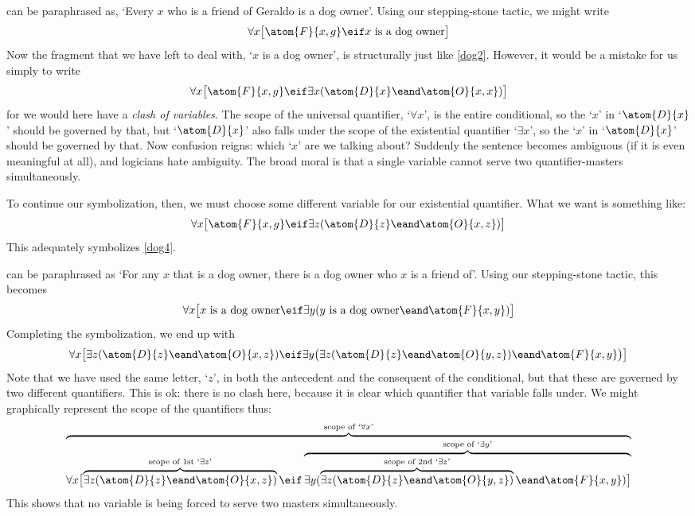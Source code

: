  can be paraphrased as, `Every $x$ who is a friend of Geraldo is a dog owner'. Using our stepping-stone tactic, we might write 
$$\forall x \bigl[\atom{F}{x,g} \eif x \text{ is a dog owner}\bigr]$$
Now the fragment that we have left to deal with, `$x$ is a dog owner', is structurally just like \cref*{dog2}. However, it would be a mistake for us simply to write 
$$\forall x \bigl[\atom{F}{x,g} \eif \exists x(\atom{D}{x} \eand \atom{O}{x,x})\bigr]$$
for we would here have a \emph{clash of variables}. The scope of the universal quantifier, `$\forall x$', is the entire conditional, so the `$x$' in `$\atom{D}{x}$' should be governed by that, but `$\atom{D}{x}$' also falls under the scope of the existential quantifier `$\exists x$', so the `$x$' in `$\atom{D}{x}$' should be governed by that. Now confusion reigns: which `$x$' are we talking about? Suddenly the sentence becomes ambiguous (if it is even meaningful at all), and logicians hate ambiguity. The broad moral is that a single variable cannot serve two quantifier-masters simultaneously.

To continue our symbolization, then, we must choose some different variable for our existential quantifier. What we want is something like:
$$\forall x\bigl[\atom{F}{x,g} \eif\exists z(\atom{D}{z} \eand \atom{O}{x,z})\bigr]$$
This adequately symbolizes \cref*{dog4}.

 can be paraphrased as `For any $x$ that is a dog owner, there is a dog owner who $x$ is a friend of'. Using our stepping-stone tactic, this becomes 
$$\forall x\bigl[\mbox{$x$ is a dog owner}\eif\exists y(\mbox{$y$ is a dog owner}\eand \atom{F}{x,y})\bigr]$$
Completing the symbolization, we end up with
$$\forall x\bigl[\exists z(\atom{D}{z} \eand \atom{O}{x,z})\eif\exists y\bigl(\exists z(\atom{D}{z} \eand \atom{O}{y,z})\eand \atom{F}{x,y}\bigr)\bigr]$$
Note that we have used the same letter, `$z$', in both the antecedent and the consequent of the conditional, but that these are governed by two different quantifiers. This is ok: there is no clash here, because it is clear which quantifier that variable falls under. We might graphically represent the scope of the quantifiers thus:
$$\overbrace{\forall x\bigl[\overbrace{\exists z(\atom{D}{z} \eand \atom{O}{x,z})}^{\text{scope of 1st `}\exists z\text{'}}\eif \overbrace{\exists y(\overbrace{\exists z(\atom{D}{z} \eand \atom{O}{y,z})}^{\text{scope of 2nd `}\exists z\text{'}}\eand \atom{F}{x,y})\bigr]}^{\text{scope of `}\exists y\text{'}}}^{\text{scope of `}\forall x\text{'}}$$
This shows that no variable is being forced to serve two masters simultaneously.

